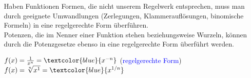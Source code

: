 Haben Funktionen Formen, die nicht unserem Regelwerk entsprechen,
muss man durch geeignete Umwandlungen (\zB Zerlegungen, Klammerauflösungen, binomische Formeln)
in eine regelgerechte Form überführen.\\
Potenzen, die im Nenner einer Funktion stehen beziehungsweise Wurzeln,
können durch die Potenzgesetze ebenso in eine regelgerechte Form überführt werden.

$f(x) = \frac{1}{x^n} = \textcolor{blue}{x^{-n}}$ \hspace{0.7cm}(\textcolor{blue}{regelgerechte Form})\\
$f(x) = \sqrt[n]{x^1} = \textcolor{blue}{x^{1/n}}$

\newpage
